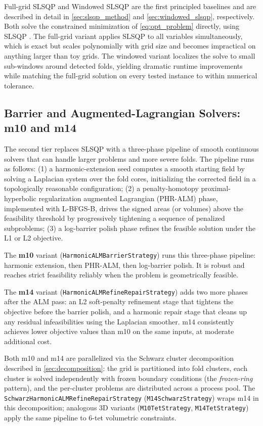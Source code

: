 \documentclass[lettersize,journal]{IEEEtran}
\begin{document}
Full-grid SLSQP and Windowed SLSQP are the first principled baselines and are described in detail in \autoref{sec:slsqp_method} and \autoref{sec:windowed_slsqp}, respectively. Both solve the constrained minimization of \autoref{eq:opt_problem} directly, using SLSQP \cite{Kraft_1988, SciPySLSQPDoc}. The full-grid variant applies SLSQP to all variables simultaneously, which is exact but scales polynomially with grid size and becomes impractical on anything larger than toy grids. The windowed variant localizes the solve to small sub-windows around detected folds, yielding dramatic runtime improvements while matching the full-grid solution on every tested instance to within numerical tolerance.

\subsection{Barrier and Augmented-Lagrangian Solvers: m10 and m14}
\label{sec:alm_solvers}

The second tier replaces SLSQP with a three-phase pipeline of smooth continuous solvers that can handle larger problems and more severe folds. The pipeline runs as follows: (1) a harmonic-extension seed computes a smooth starting field by solving a Laplacian system over the fold cores, initializing the corrected field in a topologically reasonable configuration; (2) a penalty-homotopy proximal-hyperbolic regularization augmented Lagrangian (PHR-ALM) phase, implemented with L-BFGS-B, drives the signed areas (or volumes) above the feasibility threshold by progressively tightening a sequence of penalized subproblems; (3) a log-barrier polish phase refines the feasible solution under the L1 or L2 objective.

The \textbf{m10} variant (\texttt{HarmonicALMBarrierStrategy}) runs this three-phase pipeline: harmonic extension, then PHR-ALM, then log-barrier polish. It is robust and reaches strict feasibility reliably when the problem is geometrically feasible.

The \textbf{m14} variant (\texttt{HarmonicALMRefineRepairStrategy}) adds two more phases after the ALM pass: an L2 soft-penalty refinement stage that tightens the objective before the barrier polish, and a harmonic repair stage that cleans up any residual infeasibilities using the Laplacian smoother. m14 consistently achieves lower objective values than m10 on the same inputs, at moderate additional cost.

Both m10 and m14 are parallelized via the Schwarz cluster decomposition described in \autoref{sec:decomposition}: the grid is partitioned into fold clusters, each cluster is solved independently with frozen boundary conditions (the \emph{frozen-ring} pattern), and the per-cluster problems are distributed across a process pool. The \texttt{SchwarzHarmonicALMRefineRepairStrategy} (\texttt{M14SchwarzStrategy}) wraps m14 in this decomposition; analogous 3D variants (\texttt{M10TetStrategy}, \texttt{M14TetStrategy}) apply the same pipeline to 6-tet volumetric constraints.
\end{document}
